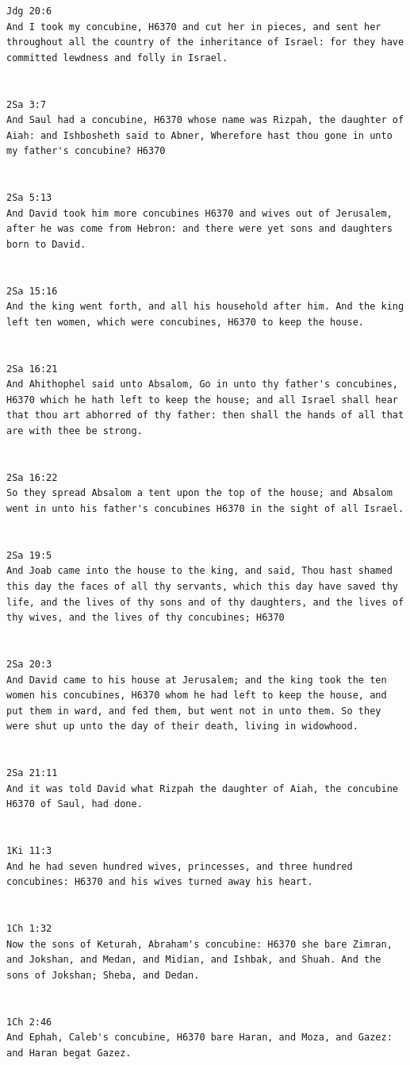 \documentclass[11pt]{article}
\begin{document}
{\begin{lstlisting}
Jdg 20:6
And I took my concubine, H6370 and cut her in pieces, and sent her throughout all the country of the inheritance of Israel: for they have committed lewdness and folly in Israel.


2Sa 3:7
And Saul had a concubine, H6370 whose name was Rizpah, the daughter of Aiah: and Ishbosheth said to Abner, Wherefore hast thou gone in unto my father's concubine? H6370


2Sa 5:13
And David took him more concubines H6370 and wives out of Jerusalem, after he was come from Hebron: and there were yet sons and daughters born to David.


2Sa 15:16
And the king went forth, and all his household after him. And the king left ten women, which were concubines, H6370 to keep the house.


2Sa 16:21
And Ahithophel said unto Absalom, Go in unto thy father's concubines, H6370 which he hath left to keep the house; and all Israel shall hear that thou art abhorred of thy father: then shall the hands of all that are with thee be strong.


2Sa 16:22
So they spread Absalom a tent upon the top of the house; and Absalom went in unto his father's concubines H6370 in the sight of all Israel.


2Sa 19:5
And Joab came into the house to the king, and said, Thou hast shamed this day the faces of all thy servants, which this day have saved thy life, and the lives of thy sons and of thy daughters, and the lives of thy wives, and the lives of thy concubines; H6370


2Sa 20:3
And David came to his house at Jerusalem; and the king took the ten women his concubines, H6370 whom he had left to keep the house, and put them in ward, and fed them, but went not in unto them. So they were shut up unto the day of their death, living in widowhood.


2Sa 21:11
And it was told David what Rizpah the daughter of Aiah, the concubine H6370 of Saul, had done.


1Ki 11:3
And he had seven hundred wives, princesses, and three hundred concubines: H6370 and his wives turned away his heart.


1Ch 1:32
Now the sons of Keturah, Abraham's concubine: H6370 she bare Zimran, and Jokshan, and Medan, and Midian, and Ishbak, and Shuah. And the sons of Jokshan; Sheba, and Dedan.


1Ch 2:46
And Ephah, Caleb's concubine, H6370 bare Haran, and Moza, and Gazez: and Haran begat Gazez.



\end{lstlisting}}
\end{document}
